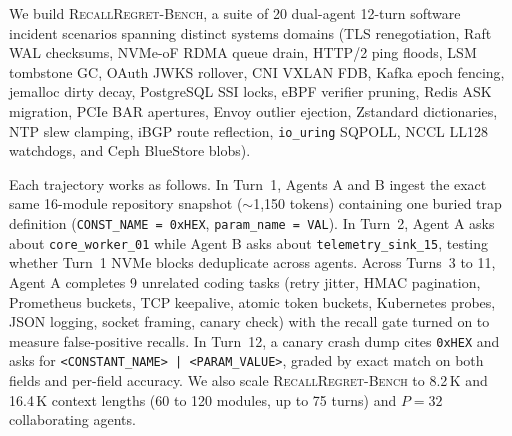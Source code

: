\documentclass[pdflatex,sn-mathphys-num]{sn-jnl}
\theoremstyle{thmstyleone}
\newcommand{\RecallBench}{\textsc{RecallRegret-Bench}}
\begin{document}
We build \RecallBench{}, a suite of 20 dual-agent 12-turn software incident scenarios spanning distinct systems domains (TLS renegotiation, Raft WAL checksums, NVMe-oF RDMA queue drain, HTTP/2 ping floods, LSM tombstone GC, OAuth JWKS rollover, CNI VXLAN FDB, Kafka epoch fencing, jemalloc dirty decay, PostgreSQL SSI locks, eBPF verifier pruning, Redis ASK migration, PCIe BAR apertures, Envoy outlier ejection, Zstandard dictionaries, NTP slew clamping, iBGP route reflection, \texttt{io\_uring} SQPOLL, NCCL LL128 watchdogs, and Ceph BlueStore blobs).

Each trajectory works as follows. In Turn~1, Agents A and B ingest the exact same 16-module repository snapshot ($\sim$1,150 tokens) containing one buried trap definition (\texttt{CONST\_NAME = 0xHEX}, \texttt{param\_name = VAL}). In Turn~2, Agent A asks about \texttt{core\_worker\_01} while Agent B asks about \texttt{telemetry\_sink\_15}, testing whether Turn~1 NVMe blocks deduplicate across agents. Across Turns~3 to 11, Agent A completes 9 unrelated coding tasks (retry jitter, HMAC pagination, Prometheus buckets, TCP keepalive, atomic token buckets, Kubernetes probes, JSON logging, socket framing, canary check) with the recall gate turned on to measure false-positive recalls. In Turn~12, a canary crash dump cites \texttt{0xHEX} and asks for \texttt{<CONSTANT\_NAME> | <PARAM\_VALUE>}, graded by exact match on both fields and per-field accuracy. We also scale \RecallBench{} to 8.2\,K and 16.4\,K context lengths (60 to 120 modules, up to 75 turns) and $P = 32$ collaborating agents.
\end{document}
